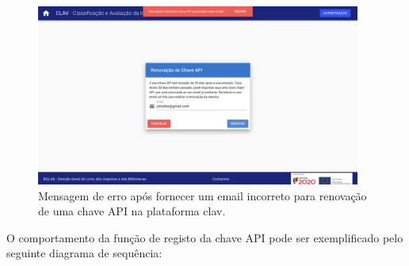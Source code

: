 \begin{itemize}
    \begin{figure}[H]
        \centering
        \includegraphics[width=0.95\textwidth]{img/clav/authAPI/erroRenovacao.png}
        \caption{Mensagem de erro após fornecer um email incorreto para renovação de uma chave API na plataforma \gls{clav}.}
        \label{fig:renovarChaveApiSucesso}
    \end{figure}
\end{itemize}

\cleardoublepage
O comportamento da função de registo da chave API pode ser exemplificado pelo seguinte diagrama de sequência:

